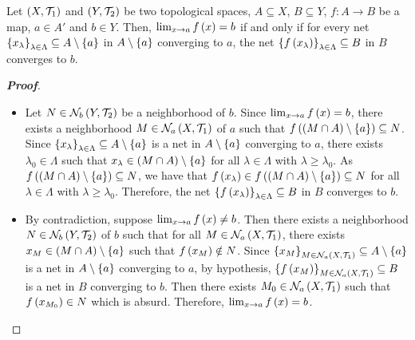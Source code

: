 \begin{proposition}\label{Characterization of limits of maps by nets convergence}
  Let $\left(X,\mathcal{T}_1\right)$ and $\left(Y,\mathcal{T}_2\right)$ be two topological spaces, $A\subseteq X$, $B\subseteq Y$, $f:A\rightarrow B$ be a map, $a\in A'$ and $b\in Y$. Then, $\lim_{x\to a}{f\left(x\right)}=b$ if and only if for every net $\left\{x_\lambda\right\}_{\lambda\in\Lambda}\subseteq A\setminus\left\{a\right\}$ in $A\setminus\left\{a\right\}$ converging to $a$, the net $\left\{f\left(x_\lambda\right)\right\}_{\lambda\in\Lambda}\subseteq B$ in $B$ converges to $b$.
  \begin{proof}[\rm\textbf{Proof}]
    \hfill
    \begin{itemize}
      \item[\boxed{\Rightarrow}] Let $N\in\mathcal{N}_b\left(Y,\mathcal{T}_2\right)$ be a neighborhood of $b$. Since $\lim_{x\to a}{f\left(x\right)}=b$, there exists a neighborhood $M\in\mathcal{N}_a\left(X,\mathcal{T}_1\right)$ of $a$ such that $f\left(\left(M\cap A\right)\setminus\left\{a\right\}\right)\subseteq N$. Since $\left\{x_\lambda\right\}_{\lambda\in\Lambda}\subseteq A\setminus\left\{a\right\}$ is a net in $A\setminus\left\{a\right\}$ converging to $a$, there exists $\lambda_0\in\Lambda$ such that $x_\lambda\in\left(M\cap A\right)\setminus\left\{a\right\}$ for all $\lambda\in\Lambda$ with $\lambda\geq\lambda_0$. As $f\left(\left(M\cap A\right)\setminus\left\{a\right\}\right)\subseteq N$, we have that $f\left(x_\lambda\right)\in f\left(\left(M\cap A\right)\setminus\left\{a\right\}\right)\subseteq N$ for all $\lambda\in\Lambda$ with $\lambda\geq\lambda_0$. Therefore, the net $\left\{f\left(x_\lambda\right)\right\}_{\lambda\in\Lambda}\subseteq B$ in $B$ converges to $b$.
      \item[\boxed{\Leftarrow}] By contradiction, suppose $\lim_{x\to a}{f\left(x\right)}\neq b$. Then there exists a neighborhood $N\in\mathcal{N}_b\left(Y,\mathcal{T}_2\right)$ of $b$ such that for all $M\in\mathcal{N}_a\left(X,\mathcal{T}_1\right)$, there exists $x_M\in\left(M\cap A\right)\setminus\left\{a\right\}$ such that $f\left(x_M\right)\notin N$. Since $\left\{x_M\right\}_{M\in\mathcal{N}_a\left(X,\mathcal{T}_1\right)}\subseteq A\setminus\left\{a\right\}$ is a net in $A\setminus\left\{a\right\}$ converging to $a$, by hypothesis, $\left\{f\left(x_M\right)\right\}_{M\in\mathcal{N}_a\left(X,\mathcal{T}_1\right)}\subseteq B$ is a net in $B$ converging to $b$. Then there exists $M_0\in\mathcal{N}_a\left(X,\mathcal{T}_1\right)$ such that $f\left(x_{M_0}\right)\in N$ which is absurd. Therefore, $\lim_{x\to a}{f\left(x\right)}=b$.
    \end{itemize}
  \end{proof}
\end{proposition}

